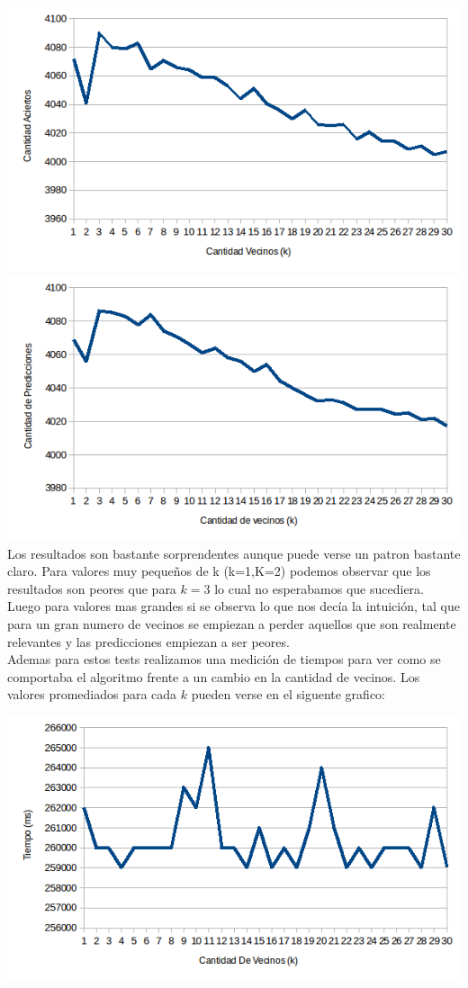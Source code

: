\includegraphics[scale=0.55]{nuevosResultados/knn/2.png}\\

\includegraphics[scale=0.55]{nuevosResultados/knn/3.png}\\

Los resultados son bastante sorprendentes aunque puede verse un patron bastante claro. Para valores muy pequeños de k (k=1,K=2) podemos observar que los resultados son peores que para $k=3$ lo cual no esperabamos que sucediera. Luego para valores mas grandes si se observa lo que nos decía la intuición, tal que para un gran numero de vecinos se empiezan a perder aquellos que son realmente relevantes y las predicciones empiezan a ser peores.
\\
Ademas para estos tests realizamos una medición de tiempos para ver como se comportaba el algoritmo frente a un cambio en la cantidad de vecinos. Los valores promediados para cada $k$ pueden verse en el siguente grafico:

\includegraphics[scale=0.55]{nuevosResultados/knn/1temp.png}\\


